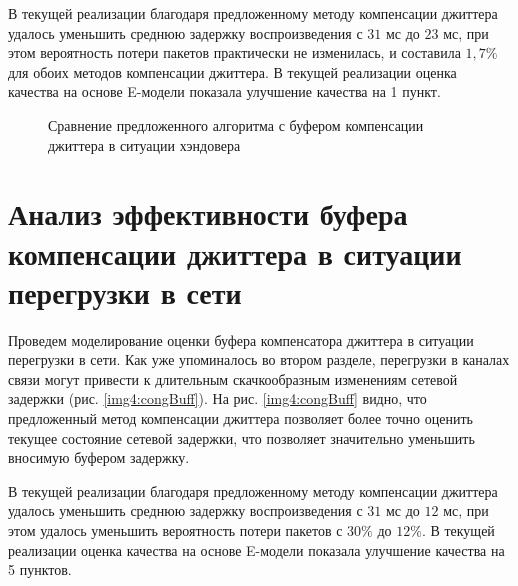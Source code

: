 В текущей реализации благодаря предложенному методу компенсации джиттера удалось уменьшить среднюю задержку воспроизведения с $31$ мс до $23$ мс, при этом вероятность потери пакетов практически не изменилась, и составила $1{,}7\%$ для обоих методов компенсации джиттера.
В текущей реализации оценка качества на основе E-модели показала улучшение качества на 1 пункт.


\pgfplotsset{width=15cm, height=10cm, compat=1.3}
\begin{figure} [!ht]
  \center
{}
\caption{Сравнение предложенного алгоритма с буфером компенсации джиттера \cite{Ramjee} в ситуации хэндовера}
  \label{img4:handBuff}
\end{figure}


\section{Анализ эффективности буфера компенсации джиттера в ситуации перегрузки в сети} \label{sect4}

Проведем моделирование оценки буфера компенсатора джиттера в ситуации перегрузки в сети. 
Как уже упоминалось во втором разделе, перегрузки в каналах связи могут привести к длительным скачкообразным изменениям сетевой задержки (рис. \ref{img4:congBuff}).
На рис. \ref{img4:congBuff} видно, что предложенный метод компенсации джиттера позволяет более точно оценить текущее состояние сетевой задержки, что позволяет значительно уменьшить вносимую буфером задержку.

В текущей реализации благодаря предложенному методу компенсации джиттера удалось уменьшить среднюю задержку воспроизведения с $31$ мс до $12$ мс, при этом удалось уменьшить вероятность потери пакетов с $30\%$ до $12\%$.
В текущей реализации оценка качества на основе E-модели показала улучшение качества на 5 пунктов.



